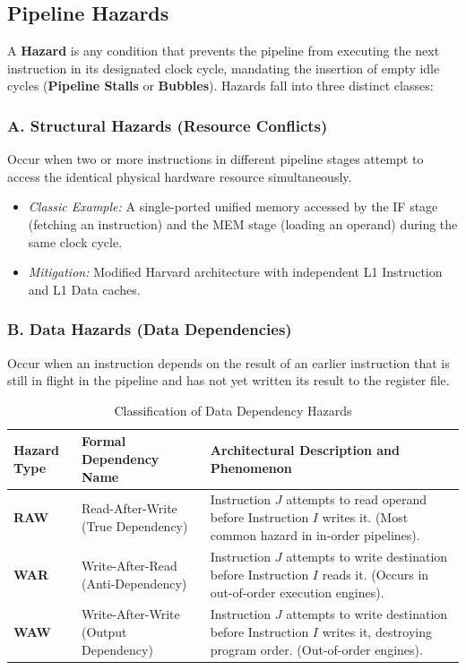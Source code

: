 \subsection{Pipeline Hazards}
A \textbf{Hazard} is any condition that prevents the pipeline from executing the next instruction in its designated clock cycle, mandating the insertion of empty idle cycles (\textbf{Pipeline Stalls} or \textbf{Bubbles}). Hazards fall into three distinct classes:

\subsubsection{A. Structural Hazards (Resource Conflicts)}
Occur when two or more instructions in different pipeline stages attempt to access the identical physical hardware resource simultaneously.
\begin{itemize}
    \item \textit{Classic Example:} A single-ported unified memory accessed by the IF stage (fetching an instruction) and the MEM stage (loading an operand) during the same clock cycle.
    \item \textit{Mitigation:} Modified Harvard architecture with independent L1 Instruction and L1 Data caches.
\end{itemize}

\subsubsection{B. Data Hazards (Data Dependencies)}
Occur when an instruction depends on the result of an earlier instruction that is still in flight in the pipeline and has not yet written its result to the register file.

\begin{table}[htbp]
\centering
\small
\caption{Classification of Data Dependency Hazards}
\label{tab:data_hazards}
\begin{tabularx}{\textwidth}{l l X}
\toprule
\textbf{Hazard Type} & \textbf{Formal Dependency Name} & \textbf{Architectural Description and Phenomenon} \\
\midrule
\textbf{RAW} & Read-After-Write (True Dependency) & Instruction $J$ attempts to read operand before Instruction $I$ writes it. (Most common hazard in in-order pipelines). \\
\textbf{WAR} & Write-After-Read (Anti-Dependency) & Instruction $J$ attempts to write destination before Instruction $I$ reads it. (Occurs in out-of-order execution engines). \\
\textbf{WAW} & Write-After-Write (Output Dependency) & Instruction $J$ attempts to write destination before Instruction $I$ writes it, destroying program order. (Out-of-order engines). \\
\bottomrule
\end{tabularx}
\end{table}

